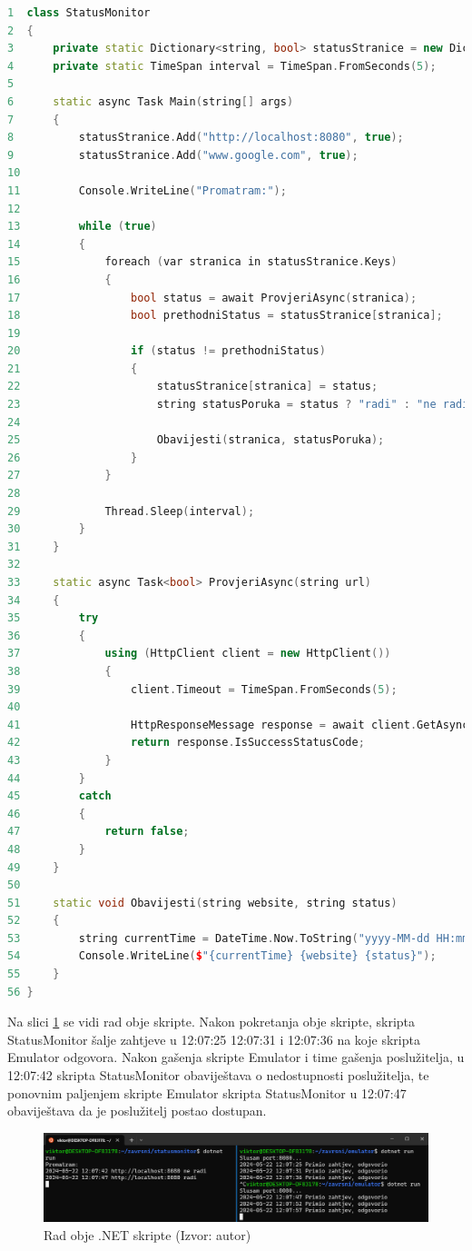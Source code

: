 \documentclass{foi}
\begin{document}
\begin{lstlisting}[language=C++]
1  class StatusMonitor
2  {
3      private static Dictionary<string, bool> statusStranice = new Dictionary<string, bool>();
4      private static TimeSpan interval = TimeSpan.FromSeconds(5);
5
6      static async Task Main(string[] args)
7      {
8          statusStranice.Add("http://localhost:8080", true);
9          statusStranice.Add("www.google.com", true);
10
11         Console.WriteLine("Promatram:");
12
13         while (true)
14         {
15             foreach (var stranica in statusStranice.Keys)
16             {
17                 bool status = await ProvjeriAsync(stranica);
18                 bool prethodniStatus = statusStranice[stranica];
19
20                 if (status != prethodniStatus)
21                 {
22                     statusStranice[stranica] = status;
23                     string statusPoruka = status ? "radi" : "ne radi";
24
25                     Obavijesti(stranica, statusPoruka);
26                 }
27             }
28
29             Thread.Sleep(interval);
30         }
31     }
32
33     static async Task<bool> ProvjeriAsync(string url)
34     {
35         try
36         {
37             using (HttpClient client = new HttpClient())
38             {
39                 client.Timeout = TimeSpan.FromSeconds(5);
40
41                 HttpResponseMessage response = await client.GetAsync(url);
42                 return response.IsSuccessStatusCode;
43             }
44         }
45         catch
46         {
47             return false;
48         }
49     }
50
51     static void Obavijesti(string website, string status)
52     {
53         string currentTime = DateTime.Now.ToString("yyyy-MM-dd HH:mm:ss");
54         Console.WriteLine($"{currentTime} {website} {status}");
55     }
56 }
\end{lstlisting}
Na slici \ref{fig:netprimjer} se vidi rad obje skripte. Nakon pokretanja obje skripte, skripta StatusMonitor šalje zahtjeve u 12:07:25 12:07:31 i 12:07:36 na koje skripta Emulator odgovora. Nakon gašenja skripte Emulator i time gašenja poslužitelja, u 12:07:42 skripta StatusMonitor obaviještava o nedostupnosti poslužitelja, te ponovnim paljenjem skripte Emulator skripta StatusMonitor u 12:07:47 obaviještava da je poslužitelj postao dostupan.
\begin{figure}[H]
    \centering
    \includegraphics[width=1.1\textwidth]{slike/netprimjer.png}
    \caption{Rad obje .NET skripte (Izvor: autor)}
    \label{fig:netprimjer}
\end{figure}
\end{document}
